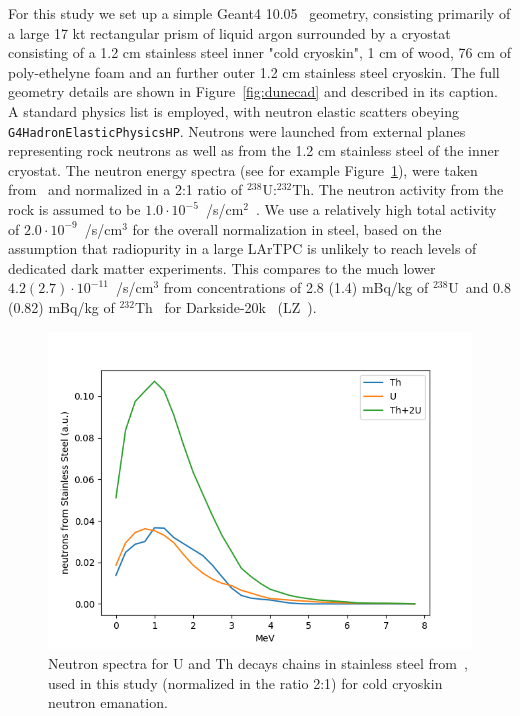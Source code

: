 \documentclass[a4paper,11pt]{article}
\newcommand{\ur}{$^{238}$U}
\newcommand{\thr}{$^{232}$Th}
\begin{document}
For this study we set up a simple Geant4 10.05~\cite{Geant4} geometry, consisting primarily of a large 17 kt rectangular prism of liquid argon surrounded by a cryostat consisting of a 1.2 cm stainless steel inner "cold cryoskin", 1 cm of wood, 76 cm of poly-ethelyne foam and an further outer 1.2 cm stainless steel cryoskin. The full geometry details are shown in Figure~\ref{fig:dunecad} and described in its caption.  A standard physics list is employed, with neutron elastic scatters obeying {\tt G4HadronElasticPhysicsHP}. Neutrons were launched from external planes representing rock neutrons as well as from the 1.2 cm stainless steel of the inner cryostat. The neutron energy spectra (see for example Figure~\ref{fig:neutrons}), were taken from~\cite{vk} and normalized in a 2:1 ratio of \ur:\thr. The neutron activity from the rock is assumed to be $1.0 \cdot 10^{-5}$~/s/cm$^{2}$~\cite{cavernRock}. We use a relatively high total activity of $2.0 \cdot 10^{-9}$~/s/cm$^3$ for the overall normalization in steel, based on the assumption that radiopurity in a large LArTPC is unlikely to reach levels of dedicated dark matter experiments. This compares to the much lower $4.2 (2.7) \cdot 10^{-11}$~/s/cm$^3$ from  concentrations of 2.8 (1.4) mBq/kg of \ur~and 0.8 (0.82) mBq/kg of \thr~ for Darkside-20k~\cite{agnes2018darkside} (LZ~\cite{LZ}).

\begin{figure}[ht]
\begin{centering}
\includegraphics[width=0.90\columnwidth]{Figures/neutrons_vk.png}
\end{centering}
\caption{Neutron spectra for  U and Th decays chains in stainless steel from~\cite{vk}, used in this study (normalized in the ratio 2:1) for cold cryoskin neutron emanation.
\label{fig:neutrons}}
\end{figure}
\end{document}
